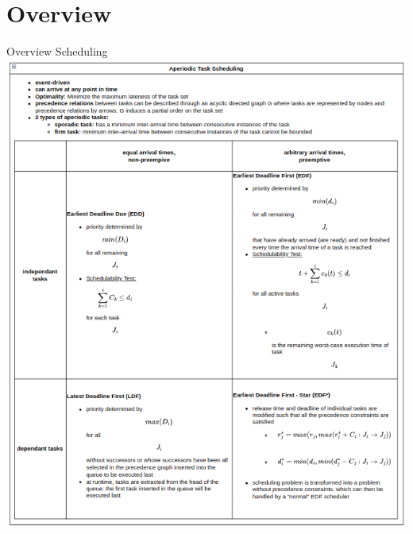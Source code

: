 \section{Overview}

\begin{frame}[allowframebreaks]{Overview Scheduling}
  \centering
  \includegraphics[height=0.7\paperheight]{./figures/aperiodic_task_scheduling.png}


\end{frame}
